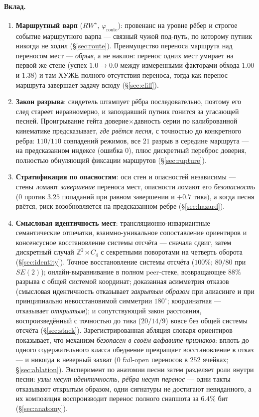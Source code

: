 \documentclass{article}
\newcommand{\rwstar}{RW^{\star}}
\newcommand{\phiroute}{\varphi_{\mathrm{route}}}
\begin{document}
\paragraph{Вклад.}
\begin{enumerate}[leftmargin=20pt,itemsep=2pt,topsep=2pt]
\item \textbf{Маршрутный варп} ($\rwstar$, $\phiroute$): провенанс на
  уровне рёбер и строгое событие маршрутного варпа --- связный чужой
  под-путь, по которому путник никогда не ходил (\S\ref{sec:route}).
  Преимущество переноса маршрута над переносом мест --- \emph{обрыв},
  а не наклон: перенос одних мест умирает на первой же стене (успех
  $1.0 \to 0.0$ между измеренными факторами обхода $1.00$ и $1.38$) и
  там ХУЖЕ полного отсутствия переноса, тогда как перенос маршрута
  завершает задачу всюду (\S\ref{sec:cliff}).
\item \textbf{Закон разрыва}: свидетель штампует рёбра последовательно,
  поэтому его след стареет неравномерно, и запоздавший путник гонится
  за угасающей песней. Проигрывание гейта доверие$\times$давность серии
  по калиброванной кинематике предсказывает, \emph{где рвётся песня},
  с точностью до конкретного ребра: $110/110$ совпадений режимов, все
  $21$ разрыв в середине маршрута --- на предсказанном индексе (ошибка
  $0$), плюс дискретный переброс доверия, полностью обнуляющий
  фиксации маршрутов (\S\ref{sec:rupture}).
\item \textbf{Стратификация по опасностям}: оси стен и опасностей
  независимы --- стены ломают \emph{завершение} переноса мест,
  опасности ломают его \emph{безопасность} ($0$ против $3.25$
  попаданий при равном завершении и $+0.7$ тика), а когда песня
  рвётся, риск возобновляется на предсказанном ребре
  (\S\ref{sec:hazard}).
\item \textbf{Смысловая идентичность мест}: трансляционно-инвариантные
  семантические отпечатки, взаимно-уникальное сопоставление ориентиров
  и консенсусное восстановление системы отсчёта --- сначала сдвиг,
  затем дискретный случай $\mathbb{Z}^2\rtimes C_4$ с секретными поворотами на четверть оборота
  (\S\ref{sec:identity}). Точное восстановление системы отсчёта
  ($100\%$; $80/80$ при $SE(2)$); онлайн-выравнивание в полном
  peer-стеке, возвращающее $88\%$ разрыва с общей системой координат;
  доказанная асимметрия отказов (смысловая идентичность отказывает
  \emph{закрытым образом} при алиасинге и при принципиально
  невосстановимой симметрии $180^\circ$; координатная --- отказывает
  \emph{открытым}); и сопутствующий закон расстояния, воспроизведённый
  с точностью до тика ($20/14/9$) вовсе без общей системы отсчёта
  (\S\ref{sec:stack}). Зарегистрированная абляция словаря ориентиров
  показывает, что механизм \emph{безопасен в своём алфавите
  признаков}: вплоть до одного содержательного класса обеднение
  превращает восстановление в отказ --- и никогда в неверный захват
  ($0$ fail-open переносов в $252$ ячейках; \S\ref{sec:ablation}).
  Эксперимент по анатомии песни затем разделяет роли внутри песни:
  \emph{узлы несут идентичность, рёбра несут перенос} --- одни такты
  отказывают открытым образом, одни сигнатуры не достигают
  невиданного, а их композиция воспроизводит перенос полного снапшота
  за $6.4\%$ бит (\S\ref{sec:anatomy}).
\end{enumerate}
\end{document}

